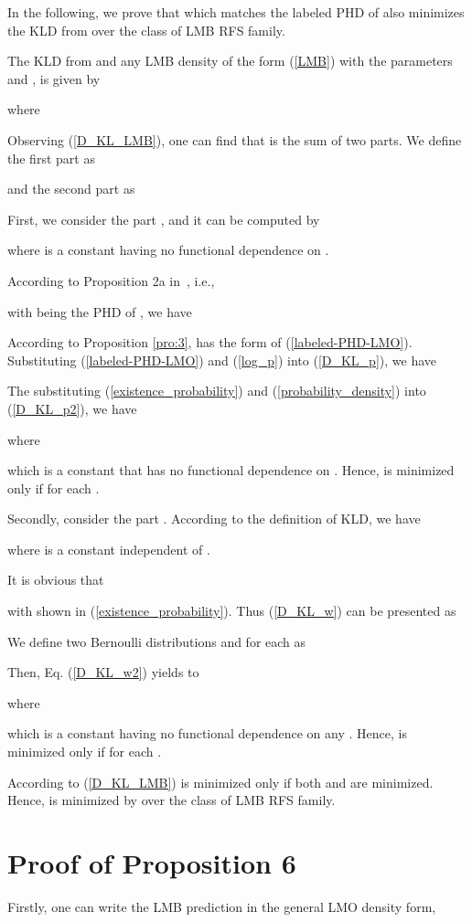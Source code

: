 \documentclass[journal]{IEEEtran}
\begin{document}
{In the following, we   prove that   which matches the labeled PHD of  also  minimizes the KLD from  over the class of LMB RFS family. 

The KLD from  and any LMB density   of the form (\ref{LMB}) with the parameters  and , is given by

where 

Observing (\ref{D_KL_LMB}), one can find that  is the sum of two parts. We define the first part as
 
and the second part as

First, we consider the part , and it can be computed by

where  is  a constant  having no functional dependence on .


According to  Proposition 2a in~\cite{refr:tracking-1}, i.e.,

with  being the PHD of , we have


According to Proposition \ref{pro:3},   has the form of (\ref{labeled-PHD-LMO}). Substituting (\ref{labeled-PHD-LMO}) and (\ref{log_p}) into (\ref{D_KL_p}), we have


The substituting (\ref{existence_probability}) and (\ref{probability_density}) into (\ref{D_KL_p2}), we have

where

which is  a constant that
has no functional dependence on  .
Hence,   is minimized only if
 for each .

Secondly, consider the part .
According to the definition of KLD, we have

where  is a constant independent of .

It is obvious that

with  shown in (\ref{existence_probability}).
Thus (\ref{D_KL_w}) can be  presented as


We define two Bernoulli distributions  and  for each  as
\begin{small}
\end{small}
Then, Eq. (\ref{D_KL_w2}) yields to

where 

which is a constant having no functional dependence on any . Hence,   is minimized only if
  for each .

According to (\ref{D_KL_LMB}) is minimized only if both  and   are minimized. Hence,  is minimized by  over the class of LMB RFS family.
\section{Proof of Proposition 6}
Firstly, one can write the LMB prediction  in the general LMO density form,

}
\end{document}
